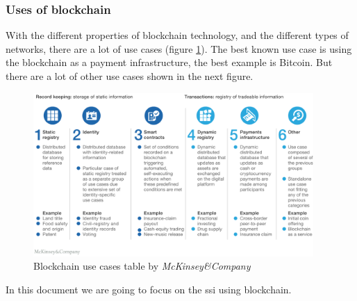\documentclass[a4paper, 12pt]{article} %
\begin{document}
            \subsubsection{Uses of blockchain}
                With the different properties of blockchain technology, and the different types of networks, there are a lot of use cases (figure \ref{fig:blockchain_uses}). The best known use case is using the blockchain as a payment infrastructure, the best example is Bitcoin. But there are a lot of other use cases shown in the next figure.\\
                \begin{figure}[h]
                    \centering
                    \includegraphics[width=0.95\textwidth]{Blockchain-uses.png}
                    \caption{Blockchain use cases table by \textit{McKinsey\&Company}}
                    \label{fig:blockchain_uses}
                \end{figure}
                
                In this document we are going to focus on the \acrfull{ssi} using blockchain.
\end{document}
